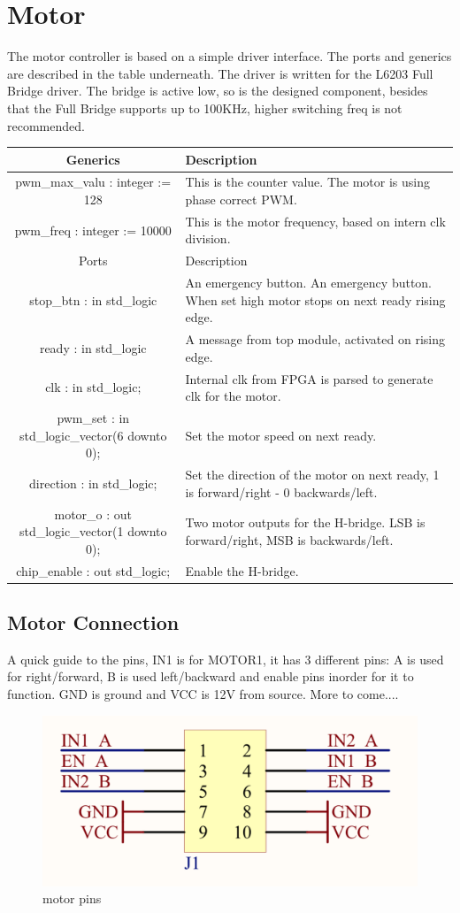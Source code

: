 \section{Motor}
The motor controller is based on a simple driver interface. The ports and generics are described in the table underneath. 
The driver is written for the L6203 Full Bridge driver. The bridge is active low, so is the designed component, besides that
the Full Bridge supports up to 100KHz, higher switching freq is not recommended.

\begin{tabular}{|c|p{7.5cm}|}
\hline 
Generics & Description\tabularnewline
\hline 
\hline 
pwm\_max\_valu : integer := 128 & This is the counter value. The motor is using phase correct PWM. \tabularnewline
\hline 
pwm\_freq : integer := 10000 & This is the motor frequency, based on intern clk division.\tabularnewline
\hline 
\hline 
Ports & Description\tabularnewline
\hline 
\hline 
stop\_btn : in std\_logic & An emergency button. An emergency button. When set high motor stops on next ready rising edge.\tabularnewline
\hline 
ready : in std\_logic & A message from top module, activated on rising edge.\tabularnewline
\hline 
clk : in std\_logic; & Internal clk from FPGA is parsed to generate clk for the motor.\tabularnewline
\hline 
pwm\_set : in std\_logic\_vector(6 downto 0); & Set the motor speed on next ready.\tabularnewline
\hline 
direction : in std\_logic; & Set the direction of the motor on next ready, 1 is forward/right - 0 backwards/left.\tabularnewline
\hline 
motor\_o : out std\_logic\_vector(1 downto 0); & Two motor outputs for the H-bridge. LSB is forward/right, MSB is
backwards/left.\tabularnewline
\hline 
chip\_enable : out std\_logic; & Enable the H-bridge.\tabularnewline
\hline 
\end{tabular}

\subsection{Motor Connection}
A quick guide to the pins, IN1 is for MOTOR1, it has 3 different pins: A is used for right/forward, B is used left/backward and enable pins inorder for it to function. GND is ground and VCC is 12V from source. More to come....

\begin{figure}[H]
    \centering
    \includegraphics[width=\textwidth]{assets/img/H_bridge_pinout.png}
    \caption{motor pins}
    \label{fig:mcu_architecture}
\end{figure}



